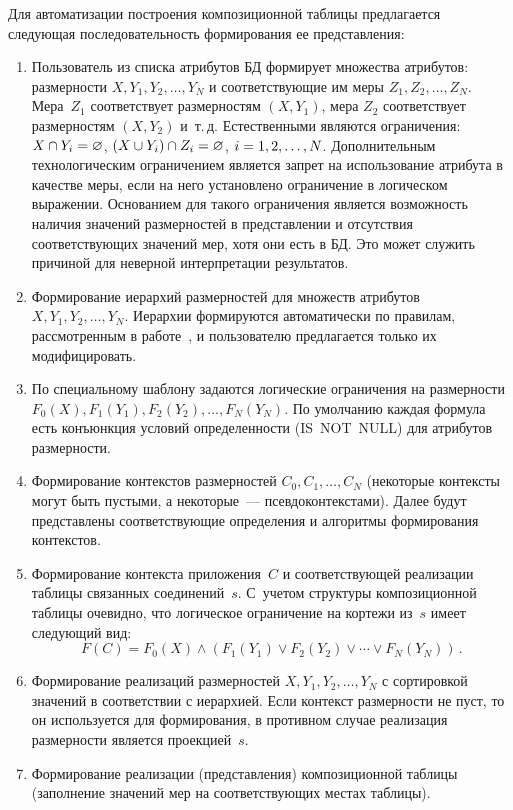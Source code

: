 \begin{multicols}{2}
  Для автоматизации построения композиционной таблицы предлагается 
следующая последовательность формирования ее представления:

\pagebreak

\noindent
  \begin{enumerate}[1.]
  \item Пользователь из списка атрибутов БД формирует множества атрибутов: 
размерности $X, Y_1, Y_2, \ldots , Y_N$ и соответствующие им меры $Z_1, Z_2, 
\ldots , Z_N$. Мера~$Z_1$ соответствует размерностям $(X, Y_1)$, мера $Z_2$ 
соответствует размерностям $(X, Y_2)$ и~т.\,д. Естественными являются 
ограничения: $X\cap Y_i \hm= \varnothing$, $(X\cup Y_i) \cap Z_i \hm=\varnothing$, 
$i\hm= 1, 2, \ldots , N$. Дополнительным технологическим ограничением 
является запрет на использование атрибута в качестве меры, если на него 
установлено ограничение в логическом выражении. Основанием для такого 
ограничения является возможность наличия значений размерностей в 
представлении и отсутствия соответствующих значений мер, хотя они есть в 
БД. Это может служить причиной для неверной интерпретации результатов.
  
  \item Формирование иерархий размерностей для множеств атрибутов~$X, 
Y_1, Y_2, \ldots , Y_N$. Иерархии формируются автоматически по правилам, 
рассмотренным в работе~\cite{9-z}, и пользователю предлагается только их 
модифицировать.
  \item По специальному шаблону задаются логические ограничения на 
размерности $F_0(X), F_1(Y_1), F_2(Y_2), \ldots , F_N(Y_N)$. По умолчанию 
каждая формула есть конъюнкция условий определенности (IS\ NOT\ NULL) 
для атрибутов размерности.
  
  \item Формирование контекстов размерностей $C_0, C_1, \ldots , C_N$ 
(некоторые контексты могут быть пустыми, а некоторые~--- 
псевдоконтекстами). Далее будут представлены соответствующие определения 
и алгоритмы формирования контекстов.
  \item Формирование контекста приложения~$C$ и соответствующей 
реализации таблицы связанных соединений~$s$. С~учетом структуры 
композиционной таблицы очевидно, что логическое ограничение на кортежи 
из~$s$ имеет следующий вид:
  $$
F(C)=F_0(X)\wedge (F_1(Y_1) \vee F_2(Y_2)\vee \cdots \vee F_N(Y_N))\,.
$$
  \item Формирование реализаций размерностей $X, Y_1, Y_2, \ldots , Y_N$ с 
сортировкой значений в соответ\-ст\-вии с иерархией. Если контекст размерности 
не пуст, то он используется для формирования, в противном случае реализация 
размерности является проекцией~$s$.
  \item Формирование реализации (представления) композиционной таблицы 
(заполнение значений мер на соответствующих местах таблицы).
  \end{enumerate}
  

\end{multicols}

